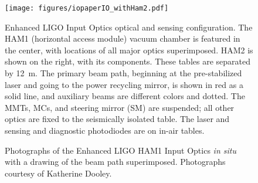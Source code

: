 \begin{figure}
\begin{centering}
\texttt{[image: figures/iopaperIO\_withHam2.pdf]}
\caption[Enhanced LIGO Input Optics optical and sensing
  configuration]{Enhanced LIGO Input Optics optical and sensing
  configuration. The HAM1 (horizontal access module) vacuum chamber is
  featured in the center, with locations of all major optics
  superimposed. HAM2 is shown on the right, with its components. These
  tables are separated by 12~m. The primary beam path, beginning at
  the pre-stabilized laser and going to the power recycling mirror, is
  shown in red as a solid line, and auxiliary beams are different
  colors and dotted. The MMTs, MCs, and steering mirror (SM) are
  suspended; all other optics are fixed to the seismically isolated
  table. The laser and sensing and diagnostic photodiodes are on
  in-air tables.}
\label{fig:IOschematic}
\end{centering}
\end{figure}

\begin{figure}
\begin{centering}
\caption[Photographs of the Enhanced LIGO HAM1 Input Optics \emph{in
  situ}]{Photographs of the Enhanced LIGO HAM1 Input Optics \emph{in
    situ} with a drawing of the beam path superimposed. Photographs
  courtesy of Katherine Dooley.}
\label{fig:IOpictures}
\end{centering}
\end{figure}


